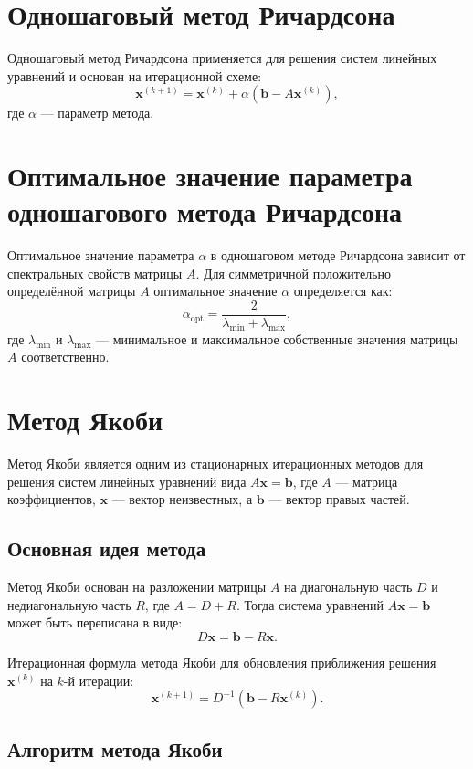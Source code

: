 \documentclass{article}
\begin{document}
\section{Одношаговый метод Ричардсона}
Одношаговый метод Ричардсона применяется для решения систем линейных уравнений и основан на итерационной схеме:
\[
\mathbf{x}^{(k+1)} = \mathbf{x}^{(k)} + \alpha (\mathbf{b} - A\mathbf{x}^{(k)}),
\]
где $\alpha$ — параметр метода.

\section{Оптимальное значение параметра одношагового метода Ричардсона}
Оптимальное значение параметра $\alpha$ в одношаговом методе Ричардсона зависит от спектральных свойств матрицы $A$. Для симметричной положительно определённой матрицы $A$ оптимальное значение $\alpha$ определяется как:
\[
\alpha_{\text{opt}} = \frac{2}{\lambda_{\min} + \lambda_{\max}},
\]
где $\lambda_{\min}$ и $\lambda_{\max}$ — минимальное и максимальное собственные значения матрицы $A$ соответственно.

\section{Метод Якоби}
Метод Якоби является одним из стационарных итерационных методов для решения систем линейных уравнений вида \(A\mathbf{x} = \mathbf{b}\), где \(A\) — матрица коэффициентов, \(\mathbf{x}\) — вектор неизвестных, а \(\mathbf{b}\) — вектор правых частей.

\subsection*{Основная идея метода}

Метод Якоби основан на разложении матрицы \(A\) на диагональную часть \(D\) и недиагональную часть \(R\), где \(A = D + R\). Тогда система уравнений \(A\mathbf{x} = \mathbf{b}\) может быть переписана в виде:
\[
D\mathbf{x} = \mathbf{b} - R\mathbf{x}.
\]

Итерационная формула метода Якоби для обновления приближения решения \(\mathbf{x}^{(k)}\) на \(k\)-й итерации:
\[
\mathbf{x}^{(k+1)} = D^{-1} (\mathbf{b} - R\mathbf{x}^{(k)}).
\]

\subsection*{Алгоритм метода Якоби}
\end{document}

